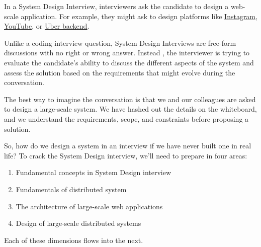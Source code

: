 

In a System Design Interview, interviewers ask the candidate to design a web-scale application. For example, they might ask to design platforms like \href{https://www.educative.io/courses/grokking-the-system-design-interview/system-design-instagram}{\ul{Instagram}}, \href{https://www.educative.io/courses/grokking-the-system-design-interview/system-design-youtube}{YouTube}, or \href{https://www.educative.io/courses/grokking-the-system-design-interview/system-design-uber}{\ul{Uber backend}}.

Unlike a coding interview question, System Design Interviews are free-form discussions with no right or wrong answer. Instead , the interviewer is trying to evaluate the candidate's ability to discuss the different aspects of the system and assess the solution based on the requirements that might evolve during the conversation.

The best way to imagine the conversation is that we and our colleagues are asked to design a large-scale system. We have hashed out the details on the whiteboard, and we understand the requirements, scope, and constraints before proposing a solution.

So, how do we design a system in an interview if we have never built one in real life? To crack the System Design interview, we'll need to prepare in four areas:

\begin{enumerate}
\item
{}\label{sytf57PllWobmyQmw6daA}
Fundamental concepts in System Design interview
\item
{}\label{C9bbfB2bmR6Q8zH_uli46}
Fundamentals of distributed system
\item
{}\label{nIOMkubVDfxaL-82Zl6a-}
The architecture of large-scale web applications
\item
{}\label{fZTijF1c8rfdHYH2hGOLh}
Design of large-scale distributed systems
\end{enumerate}

Each of these dimensions flows into the next.

